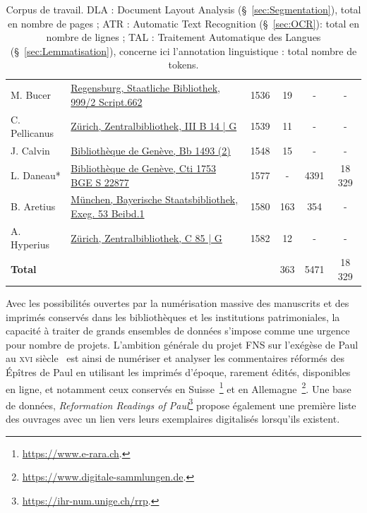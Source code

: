 \documentclass[final, fra]{anthology-ch}      %
\begin{document}
\begin{table}[t]
{\begin{tabular}{l p{6cm} c c c c}
        M. Bucer &
        \href{https://mdz-nbn-resolving.de/urn:nbn:de:bvb:12-bsb11059175-0}{Regensburg, Staatliche Bibliothek, 999/2 Script.662} &
        1536 & 19 & - &  - \\

        C. Pellicanus &
        \href{https://doi.org/10.3931/e-rara-2604}{Zürich, Zentralbibliothek, III B 14 | G} &
        1539 & 11 & - & - \\

        J. Calvin &
        \href{https://doi.org/10.3931/e-rara-5708}{Bibliothèque de Genève, Bb 1493 (2)} &
        1548 & 15 & - &  -\\

        L. Daneau* &
        \href{https://doi.org/10.3931/e-rara-6338}{Bibliothèque de Genève, Cti 1753 BGE S 22877} &
        1577 & - & 4391 & 18 329 \\

        B. Aretius &
        \href{https://mdz-nbn-resolving.de/urn:nbn:de:bvb:12-bsb10313792-3}{München, Bayerische Staatsbibliothek, Exeg. 53 Beibd.1} &
        1580 & 163 & 354 & -  \\

        A. Hyperius &
        \href{https://doi.org/10.3931/e-rara-62382}{Zürich, Zentralbibliothek, C 85 | G} &
        1582 & 12 & - &  - \\

        \midrule
         \textbf{Total} & & & 363 & 5471 & 18 329  \\
        \bottomrule
    \end{tabular}
    }
    \caption{Corpus de travail.
    DLA : Document Layout Analysis (§~\ref{sec:Segmentation}), total en nombre de pages ; ATR : Automatic Text Recognition (§~\ref{sec:OCR}): total en nombre de lignes  ; TAL : Traitement Automatique des Langues (§~\ref{sec:Lemmatisation}), concerne ici l'annotation linguistique : total nombre de tokens. }
    \label{tab:corpus}
\end{table}



Avec les possibilités ouvertes par la numérisation massive des manuscrits et des imprimés conservés dans les bibliothèques et les institutions patrimoniales, la capacité à traiter de grands ensembles de données s'impose comme une urgence pour nombre de projets. L'ambition générale du projet FNS sur l'exégèse de Paul au \textsc{xvi}\ieme{} siècle~\cite{exegesisofPaul_2023} 
est ainsi de numériser et analyser les commentaires réformés des Épîtres de Paul en utilisant les imprimés d'époque, rarement édités, disponibles en ligne, et notamment ceux conservés en Suisse~\footnote{\url{https://www.e-rara.ch}.} et en Allemagne~\footnote{\url{https://www.digitale-sammlungen.de}.}. Une base de données, \textit{Reformation Readings of Paul}\footnote{\url{https://ihr-num.unige.ch/rrp}.} propose également une première liste des ouvrages avec un lien vers leurs exemplaires digitalisés lorsqu'ils existent.
\end{document}
